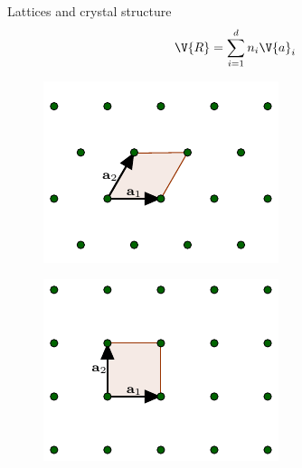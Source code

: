 \documentclass{beamer}
\begin{document}
\begin{frame}{Lattices and crystal structure}
\begin{equation*}
\V{R} = \sum_{i = 1}^{d} n_i \V{a}_i
\end{equation*}
\begin{figure}[H]
	\centering
	\begin{minipage}{.4\textwidth}
		\centering
		\includegraphics[width=\linewidth]{figures/triangularUnit.pdf}
		\label{fig:triangular_unitcell}
	\end{minipage}%
	\hfill
	\begin{minipage}{.4\textwidth}
		\centering
		\includegraphics[width=\linewidth]{figures/squareUnit.pdf}
		\label{fig:square_unitcell}
	\end{minipage}
\end{figure}
\end{frame}
\end{document}

